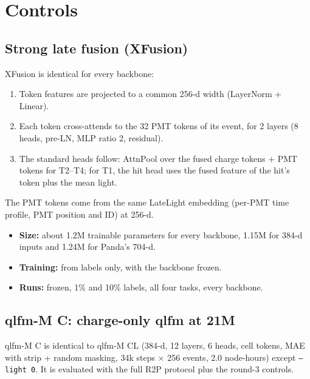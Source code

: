 \documentclass[11pt,a4paper]{article}
\newcommand{\code}[1]{\texttt{\small #1}}
\begin{document}
\section{Controls}
\subsection{Strong late fusion (XFusion)}\label{sec:xf}
XFusion is identical for every backbone:
\begin{enumerate}
  \item Token features are projected to a common 256-d width (LayerNorm + Linear).
  \item Each token cross-attends to the 32 PMT tokens of its event, for 2 layers (8 heads, pre-LN, MLP ratio 2, residual).
  \item The standard heads follow: AttnPool over the fused charge tokens + PMT tokens for T2--T4; for T1, the hit head uses the fused feature of the hit's token plus the mean light.
\end{enumerate}
The PMT tokens come from the same LateLight embedding (per-PMT time profile, PMT position and ID) at 256-d.
\begin{itemize}
  \item \textbf{Size:} about 1.2M trainable parameters for every backbone, 1.15M for 384-d inputs and 1.24M for Panda's 704-d.
  \item \textbf{Training:} from labels only, with the backbone frozen.
  \item \textbf{Runs:} frozen, 1\% and 10\% labels, all four tasks, every backbone.
\end{itemize}

\subsection{qlfm-M C: charge-only qlfm at 21M}
qlfm-M C is identical to qlfm-M CL (384-d, 12 layers, 6 heads, cell tokens, MAE with strip + random masking, 34k steps $\times$ 256 events, 2.0 node-hours) except \code{--light 0}. It is evaluated with the full R2P protocol plus the round-3 controls.
\end{document}
